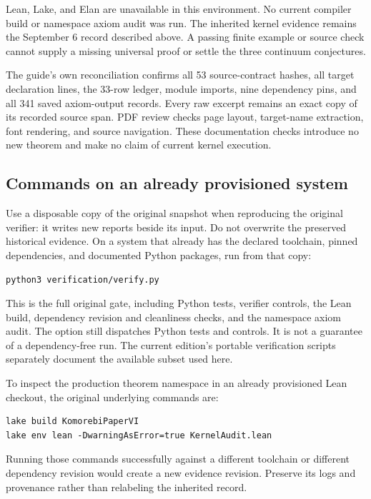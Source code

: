 Lean, Lake, and Elan are unavailable in this environment. No current compiler build or namespace axiom audit was run. The inherited kernel evidence remains the September 6 record described above. A passing finite example or source check cannot supply a missing universal proof or settle the three continuum conjectures.

The guide's own reconciliation confirms all 53 source-contract hashes, all target declaration lines, the 33-row ledger, module imports, nine dependency pins, and all 341 saved axiom-output records. Every raw excerpt remains an exact copy of its recorded source span. PDF review checks page layout, target-name extraction, font rendering, and source navigation. These documentation checks introduce no new theorem and make no claim of current kernel execution.

\subsection{Commands on an already provisioned system}
Use a disposable copy of the original snapshot when reproducing the original verifier: it writes new reports beside its input. Do not overwrite the preserved historical evidence. On a system that already has the declared toolchain, pinned dependencies, and documented Python packages, run from that copy:
\begin{Verbatim}[fontsize=\small,frame=leftline,breaklines=true]
python3 verification/verify.py
\end{Verbatim}
This is the full original gate, including Python tests, verifier controls, the Lean build, dependency revision and cleanliness checks, and the namespace axiom audit. The  option still dispatches Python tests and controls. It is not a guarantee of a dependency-free run. The current edition's portable verification scripts separately document the available subset used here.

To inspect the production theorem namespace in an already provisioned Lean checkout, the original underlying commands are:
\begin{Verbatim}[fontsize=\small,frame=leftline,breaklines=true]
lake build KomorebiPaperVI
lake env lean -DwarningAsError=true KernelAudit.lean
\end{Verbatim}
Running those commands successfully against a different toolchain or different dependency revision would create a new evidence revision. Preserve its logs and provenance rather than relabeling the inherited record.

